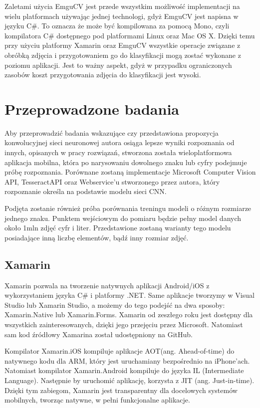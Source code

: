 \documentclass[brudnopis]{xmgr}
\begin{document}
Zaletami użycia EmguCV jest przede wszystkim możliwość implementacji na wielu platformach używając jednej technologi, gdyż EmguCV jest napisna w języku C\#. To oznacza że może być kompilowana za pomocą Mono, czyli kompilatora C\# dostępnego pod platformami Linux oraz Mac OS X. Dzięki temu przy użyciu platformy Xamarin oraz EmguCV wszystkie operacje związane z obróbką zdjęcia i przygotowaniem go do klasyfikacji mogą zostać wykonane z poziomu aplikacji. Jest to ważny aspekt, gdyż w przypadku ograniczonych zasobów koszt przygotowania zdjęcia do klasyfikacji jest wysoki.

\chapter{Przeprowadzone badania}

Aby przeprowadzić badania wskazujące czy przedstawiona propozycja konwolucyjnej sieci neuronowej autora osiąga lepsze wyniki rozpoznania od innych, opisanych w pracy rozwiązań, stworzona została wieloplatformowa aplikacja mobilna, która po narysowaniu dowolnego znaku lub cyfry podejmuje próbę rozpoznania.
Porównane zostaną implementacje Microsoft Computer Vision API\cite{9}, TesseractAPI\cite{10} oraz Webservice'u\cite{5} stworzonego przez autora, który rozpoznanie określa na podstawie modelu sieci CNN\cite{14}.

Podjęta zostanie również próba porównania treningu modeli o różnym rozmiarze jednego znaku. Punktem wejściowym do pomiaru będzie pełny model danych około 1mln zdjęć cyfr i liter. Przedstawione zostaną warianty tego modelu posiadające inną liczbę elementów, bądź inny rozmiar zdjęć.

\section{Xamarin}

Xamarin\cite{15} pozwala na tworzenie natywnych aplikacji Android/iOS z wykorzystaniem języka C\# i platformy .NET. Same aplikacje tworzymy w Visual Studio lub Xamarin Studio, a możemy do tego podejść na dwa sposoby: Xamarin.Native lub Xamarin.Forms. Xamarin od zeszłego roku jest dostępny dla wszystkich zainteresowanych, dzięki jego przejęciu przez Microsoft. Natomiast sam kod źródłowy Xamarina został udostępniony na GitHub.

Kompilator Xamarin.iOS kompiluje aplikacje AOT(ang. Ahead-of-time)  do natywnego kodu dla ARM, który jest uruchamiany bezpośrednio na iPhone’ach. Natomiast kompilator Xamarin.Android kompiluje do języka IL (Intermediate Language). Następnie by uruchomić aplikację, korzysta z JIT (ang. Just-in-time). Dzięki tym zabiegom, Xamarin jest transparentny dla docelowych systemów mobilnych, tworząc natywne, w pełni funkcjonalne aplikacje.
\end{document}
